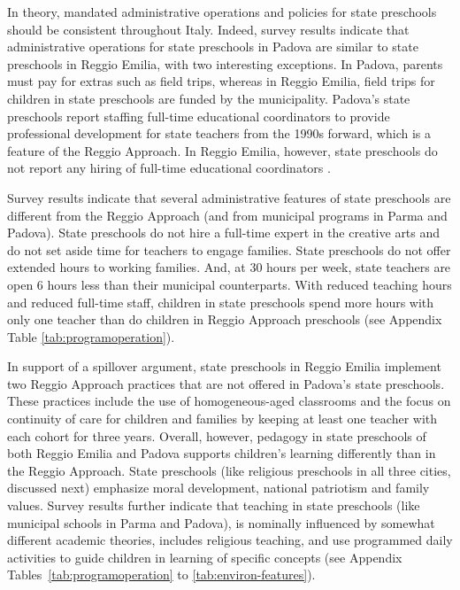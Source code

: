 In theory, mandated administrative operations and policies for state preschools should be consistent throughout Italy. Indeed, survey results indicate that administrative operations for state preschools in Padova are similar to state preschools in Reggio Emilia, with two interesting exceptions. In Padova, parents must pay for extras such as field trips, whereas in Reggio Emilia, field trips for children in state preschools are funded by the municipality. Padova's state preschools report staffing full-time educational coordinators to provide professional development for state teachers from the 1990s forward, which is a feature of the Reggio Approach. In Reggio Emilia, however, state preschools do not report any hiring of full-time educational coordinators \citep{CEHD_2016_Historical-Analysis}.

Survey results indicate that several administrative features of state preschools are different from the Reggio Approach (and from municipal programs in Parma and Padova). State preschools do not hire a full-time expert in the creative arts and do not set aside time for teachers to engage families. State preschools do not offer extended hours to working families. And, at 30 hours per week, state teachers are open 6 hours less than their municipal counterparts. With reduced teaching hours and reduced full-time staff, children in state preschools spend more hours with only one teacher than do children in Reggio Approach preschools (see Appendix Table \ref{tab:programoperation}).

In support of a spillover argument, state preschools in Reggio Emilia implement two Reggio Approach practices that are not offered in Padova's state preschools. These practices include the use of homogeneous-aged classrooms and the focus on continuity of care for children and families by keeping at least one teacher with each cohort for three years. Overall, however, pedagogy in state preschools of both Reggio Emilia and Padova  supports children's learning differently than in the Reggio Approach. State preschools (like religious preschools in all three cities, discussed next) emphasize moral development, national patriotism and family values. Survey results further indicate that teaching in state preschools (like municipal schools in Parma and Padova), is nominally influenced by somewhat different academic theories, includes religious teaching, and use programmed daily activities to guide children in learning of specific concepts (see Appendix Tables~\ref{tab:programoperation} to \ref{tab:environ-features}).

